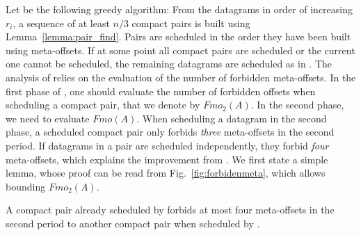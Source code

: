 Let \compactpair be the following greedy algorithm: From the datagrams in order
of increasing $r_i$, a sequence of at least $n/3$ compact pairs is built using Lemma~\ref{lemma:pair_find}. Pairs are scheduled in the order they have been built using meta-offsets. If at some point all compact pairs are scheduled or the current one cannot be scheduled, the remaining datagrams are scheduled as in \metaoffset. The analysis of \compactpair relies on the evaluation of the number of forbidden meta-offsets. In the first phase of \compactpair, one should evaluate the number of forbidden offsets when scheduling a compact pair, that we denote by $Fmo_2(A)$. In the second phase, we need to evaluate $Fmo(A)$. When scheduling a datagram in the second phase, a scheduled compact pair only forbids \emph{three} meta-offsets in the second period. If datagrams in a pair are scheduled independently, they forbid \emph{four} meta-offsets, which explains the improvement from \compactpair. We first state a simple lemma, whose proof can be read from Fig.~\ref{fig:forbidenmeta}, which allows bounding $Fmo_2(A)$.

\begin{lemma}\label{lemma:pair_forbid}
A compact pair already scheduled by \compactpair forbids at most four meta-offsets in the second period to another compact pair when scheduled by \compactpair.
\end{lemma}


